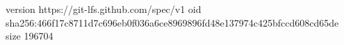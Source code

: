 version https://git-lfs.github.com/spec/v1
oid sha256:466f17c8711d7c696eb0f036a6ce8969896fd48e137974c425bfccd608cd65de
size 196704
